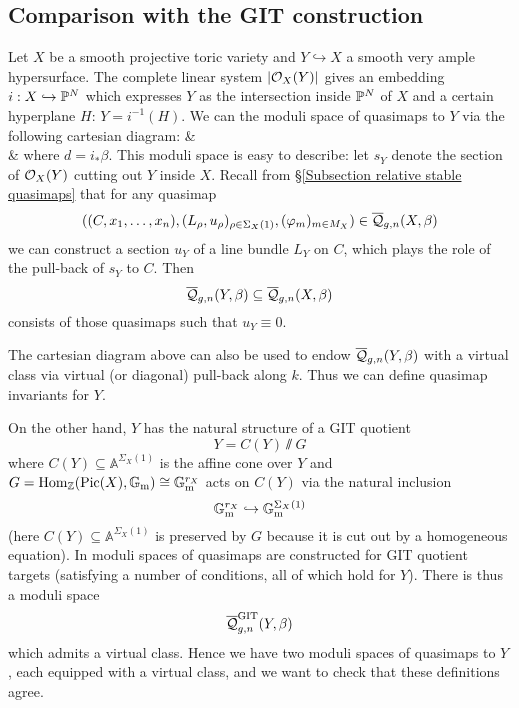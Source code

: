 \subsection{Comparison with the GIT construction} \label{Section comparison with GIT construction}

Let $X$ be a smooth projective toric variety and $Y \hookrightarrow X$ a smooth very ample hypersurface. The complete linear system $|\mathcal{O}_X(Y)|$ gives an embedding $i : X \hookrightarrow \mathbb P^N$ which expresses $Y$ as the intersection inside $\mathbb P^N$ of $X$ and a certain hyperplane $H$: $Y=i^{-1}(H)$. We can  the moduli space of quasimaps to $Y$ via the following cartesian diagram:
\bcd
{}\ar[d, hook] \ar[r, hook] &  \ar[d, hook] \\
\ar[r,hook, "k"] & 
\ecd
where $d=i_*\beta$. This moduli space is easy to describe: let $s_Y$ denote the section of $\mathcal{O}_X(Y)$ cutting out $Y$ inside $X$. Recall from \S \ref{Subsection relative stable quasimaps} that for any quasimap
\begin{equation*} ((C,x_1,\ldots,x_n),(L_\rho,u_\rho)_{\rho \in \Sigma_X(1)}, (\varphi_m)_{m \in M_X}) \in \overline{\mathcal Q}_{g,n}(X,\beta) \end{equation*}
we can construct a section $u_Y$ of a line bundle $L_Y$ on $C$, which plays the role of the pull-back of $s_Y$ to $C$. Then
\begin{equation*} \overline{\mathcal Q}_{g,n}(Y,\beta) \subseteq \overline{\mathcal Q}_{g,n}(X,\beta) \end{equation*}
consists of those quasimaps such that $u_Y \equiv 0$.

The cartesian diagram above can also be used to endow $\overline{\mathcal Q}_{g,n}(Y,\beta)$ with a virtual class via virtual (or diagonal) pull-back along $k$. Thus we can define quasimap invariants for $Y$.

On the other hand, $Y$ has the natural structure of a GIT quotient
\begin{equation*} Y = C(Y) \sslash G \end{equation*}
where $C(Y)\subseteq \mathbb A^{\Sigma_X(1)}$ is the affine cone over $Y$ and $G=\operatorname{Hom}_{\mathbb Z}(\operatorname{Pic}(X),\mathbb{G}_{\text{m}})\cong\mathbb{G}_{\text{m}}^{r_X}$ acts on $C(Y)$ via the natural inclusion
\begin{equation*} \mathbb{G}_{\text{m}}^{r_X}\hookrightarrow \mathbb{G}_{\text{m}}^{\Sigma_X(1)} \end{equation*}
(here $C(Y)\subseteq \mathbb{A}^{\Sigma_X(1)}$ is preserved by $G$ because it is cut out by a homogeneous equation). In \cite{CFKM} moduli spaces of quasimaps are constructed for GIT quotient targets (satisfying a number of conditions, all of which hold for $Y$). There is thus a moduli space
\begin{equation*} \overline{\mathcal{Q}}^{\operatorname{GIT}}_{g,n}(Y,\beta) \end{equation*}
which admits a virtual class. Hence we have two moduli spaces of quasimaps to $Y$, each equipped with a virtual class, and we want to check that these definitions agree.

